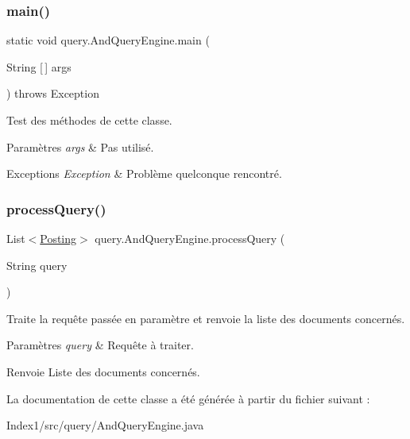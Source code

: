 \subsubsection{\texorpdfstring{main()}{main()}}
{\footnotesize\ttfamily static void query.\+And\+Query\+Engine.\+main (\begin{DoxyParamCaption}\item[{String \mbox{[}$\,$\mbox{]}}]{args }\end{DoxyParamCaption}) throws Exception\hspace{0.3cm}{\ttfamily [static]}}

Test des méthodes de cette classe.


\begin{DoxyParams}{Paramètres}
{\em args} & Pas utilisé.\\
\hline
\end{DoxyParams}

\begin{DoxyExceptions}{Exceptions}
{\em Exception} & Problème quelconque rencontré. \\
\hline
\end{DoxyExceptions}
\mbox{\label{classquery_1_1AndQueryEngine_a41f8316a47cc313b95839959ec4de38a}} 
\subsubsection{\texorpdfstring{process\+Query()}{processQuery()}}
{\footnotesize\ttfamily List$<$\hyperlink{classindexation_1_1content_1_1Posting}{Posting}$>$ query.\+And\+Query\+Engine.\+process\+Query (\begin{DoxyParamCaption}\item[{String}]{query }\end{DoxyParamCaption})}

Traite la requête passée en paramètre et renvoie la liste des documents concernés.


\begin{DoxyParams}{Paramètres}
{\em query} & Requête à traiter. \\
\hline
\end{DoxyParams}
\begin{DoxyReturn}{Renvoie}
Liste des documents concernés. 
\end{DoxyReturn}


La documentation de cette classe a été générée à partir du fichier suivant \+:\begin{DoxyCompactItemize}
\item 
Index1/src/query/And\+Query\+Engine.\+java\end{DoxyCompactItemize}

